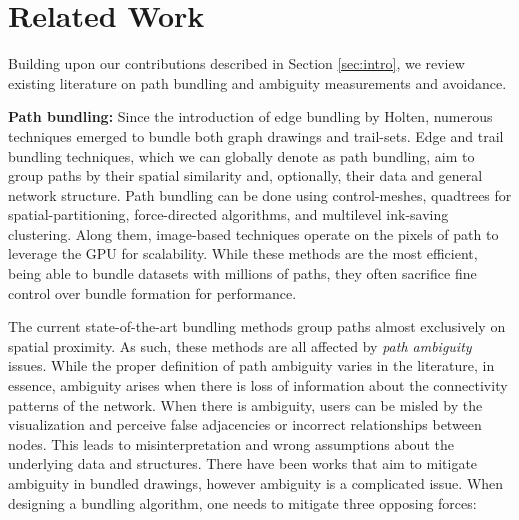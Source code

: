 
\section{Related Work}\label{sec:rw}


Building upon our contributions described in Section \ref{sec:intro}, we review existing literature on path bundling and ambiguity measurements and avoidance.

\textbf{Path bundling:} Since the introduction of edge bundling by Holten\cite{holten:2006}, numerous techniques emerged to bundle both graph drawings and trail-sets\cite{lhuillier:2017:survey}. Edge and trail bundling techniques, which we can globally denote as path bundling, aim to group paths by their spatial similarity and, optionally, their data and general network structure. Path bundling can be done using control-meshes\cite{cui:2008}, quadtrees for spatial-partitioning\cite{lambert:2010}, force-directed algorithms\cite{holten:2009,nguyen:2012,selassie:2011}, and multilevel ink-saving clustering\cite{gansner:2011}. Along them, image-based techniques\cite{telea:2010,ersoy:2011,hurter:2012,bottger:2014,wu:2015,van:2016,lhuillier:2017:ffteb,zeng:2019} operate on the pixels of path to leverage the GPU for scalability. While these methods are the most efficient, being able to bundle datasets with millions of paths, they often sacrifice fine control over bundle formation for performance.

The current state-of-the-art bundling methods group paths almost exclusively on spatial proximity. As such, these methods are all affected by \emph{path ambiguity} issues. While the proper definition of path ambiguity varies in the literature, in essence, ambiguity arises when there is loss of information about the connectivity patterns of the network. When there is ambiguity, users can be misled by the visualization and perceive false adjacencies or incorrect relationships between nodes. This leads to misinterpretation and wrong assumptions about the underlying data and structures. There have been works that aim to mitigate ambiguity in bundled drawings, however ambiguity is a complicated issue. When designing a bundling algorithm, one needs to mitigate three opposing forces:

